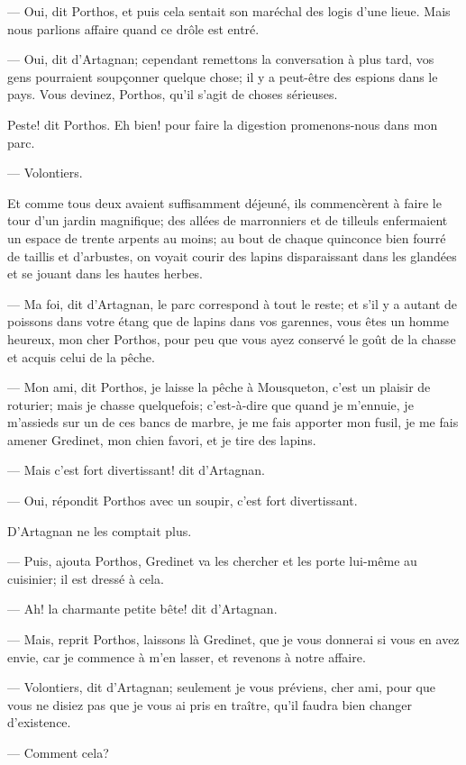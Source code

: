 — Oui, dit Porthos, et puis cela sentait son maréchal des logis d'une lieue. Mais nous parlions affaire quand ce drôle est entré.

— Oui, dit d'Artagnan; cependant remettons la conversation à plus tard, vos gens pourraient soupçonner quelque chose; il y a peut-être des espions dans le pays. Vous devinez, Porthos, qu'il s'agit de choses sérieuses.

Peste! dit Porthos. Eh bien! pour faire la digestion promenons-nous dans mon parc.

— Volontiers.

Et comme tous deux avaient suffisamment déjeuné, ils commencèrent à faire le tour d'un jardin magnifique; des allées de marronniers et de tilleuls enfermaient un espace de trente arpents au moins; au bout de chaque quinconce bien fourré de taillis et d'arbustes, on voyait courir des lapins disparaissant dans les glandées et se jouant dans les hautes herbes.

— Ma foi, dit d'Artagnan, le parc correspond à tout le reste; et s'il y a autant de poissons dans votre étang que de lapins dans vos garennes, vous êtes un homme heureux, mon cher Porthos, pour peu que vous ayez conservé le goût de la chasse et acquis celui de la pêche.

— Mon ami, dit Porthos, je laisse la pêche à Mousqueton, c'est un plaisir de roturier; mais je chasse quelquefois; c'est-à-dire que quand je m'ennuie, je m'assieds sur un de ces bancs de marbre, je me fais apporter mon fusil, je me fais amener Gredinet, mon chien favori, et je tire des lapins.

— Mais c'est fort divertissant! dit d'Artagnan.

— Oui, répondit Porthos avec un soupir, c'est fort divertissant.

D'Artagnan ne les comptait plus.

— Puis, ajouta Porthos, Gredinet va les chercher et les porte lui-même au cuisinier; il est dressé à cela.

— Ah! la charmante petite bête! dit d'Artagnan.

— Mais, reprit Porthos, laissons là Gredinet, que je vous donnerai si vous en avez envie, car je commence à m'en lasser, et revenons à notre affaire.

— Volontiers, dit d'Artagnan; seulement je vous préviens, cher ami, pour que vous ne disiez pas que je vous ai pris en traître, qu'il faudra bien changer d'existence.

— Comment cela?

